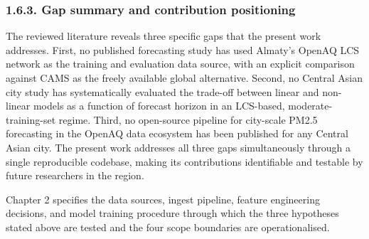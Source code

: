 \subsubsection{1.6.3. Gap summary and contribution positioning}\label{gap-summary-and-contribution-positioning}

The reviewed literature reveals three specific gaps that the present work addresses. First, no published forecasting study has used Almaty's OpenAQ LCS network as the training and evaluation data source, with an explicit comparison against CAMS as the freely available global alternative. Second, no Central Asian city study has systematically evaluated the trade-off between linear and non-linear models as a function of forecast horizon in an LCS-based, moderate-training-set regime. Third, no open-source pipeline for city-scale PM2.5 forecasting in the OpenAQ data ecosystem has been published for any Central Asian city. The present work addresses all three gaps simultaneously through a single reproducible codebase, making its contributions identifiable and testable by future researchers in the region.

Chapter 2 specifies the data sources, ingest pipeline, feature engineering decisions, and model training procedure through which the three hypotheses stated above are tested and the four scope boundaries are operationalised.

